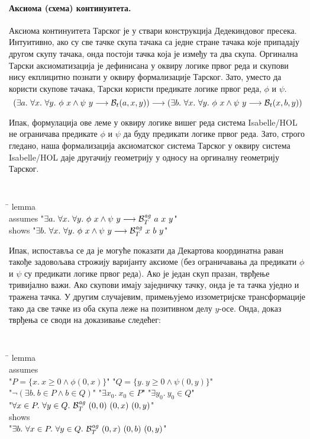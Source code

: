 \paragraph{Аксиома (схема) континуитета.}

Аксиома континуитета Тарског је у ствари конструкција Дедекиндовог
пресека. Интуитивно, ако су све тачке скупа тачака са једне стране
тачака које припадају другом скупу тачака, онда постоји тачка која је
између та два скупа. Оргинална Тарски аксиоматизација је дефинисана у
оквиру логике првог реда и скупови нису екплицитно познати у оквиру
формализације Тарског. Зато, уместо да користи скупове тачака, Тарски
користи предикате логике првог реда, $\phi$ и $\psi$.
$$(\exists a.\ \forall x.\ \forall y.\ \phi\ x \wedge \psi\ y \longrightarrow \bett{a}{x}{y}) \longrightarrow (\exists b.\ \forall x.\ \forall y.\ \phi\ x \wedge \psi\ y \longrightarrow \bett{x}{b}{y})$$

Ипак, формулација ове леме у оквиру логике вишег реда система
Isabelle/HOL не ограничава предикате $\phi$ и $\psi$ да буду
предикати логике првог реда. Зато, строго гледано, наша формализација
аксиоматског система Тарског у оквиру система Isabelle/HOL даје
другачију геометрију у односу на оргиналну геометрију Тарског.

{\tt
\begin{tabbing}
\hspace{5mm}\=\kill
lemma\\
\>assumes "$\exists a.\ \forall x.\ \forall y.\ \phi\ x \wedge \psi\ y \longrightarrow \agbett{a}{x}{y}$"\\
\>shows "$\exists b.\ \forall x.\ \forall y.\ \phi\ x \wedge \psi\ y \longrightarrow \agbett{x}{b}{y}$"
\end{tabbing}
}

Ипак, испоставља се да је могуће показати да Декартова координатна
раван такође задовољава строжију варијанту аксиоме (без ограничавања
да предикати $\phi$ и $\psi$ су предикати логике првог реда). Ако је
један скуп празан, тврђење тривијално важи. Ако скупови имају
заједничку тачку, онда је та тачка уједно и тражена тачка. У другим
случајевим, примењујемо иззометријске трансформације тако да све тачке
из оба скупа леже на позитивном делу $y$-осе. Онда, доказ тврђења се
своди на доказивање следећег:

{\tt
\begin{tabbing}
\hspace{5mm}\=\kill
lemma\\
\>assumes\\
\>"$P = \{x.\ x\ge 0 \wedge \phi(0, x)\}$" "$Q = \{y.\ y\ge 0\wedge \psi(0, y)\}$"\\
\>"$\neg (\exists b.\ b \in P \wedge b \in Q)$" "$\exists x_0.\ x_0 \in P$" "$\exists y_0.\ y_0 \in Q$"\\
\>"$\forall x \in P.\ \forall y \in Q.\ \agbett{(0, 0)}{(0, x)}{(0, y)}$"\\
\>shows\\
\>"$\exists b.\ \forall x \in P.\ \forall y \in Q.\ \mathcal{B}_T^{\mathit{ag}}\ (0, x)\ (0, b)\ (0, y)$"
\end{tabbing}
}

